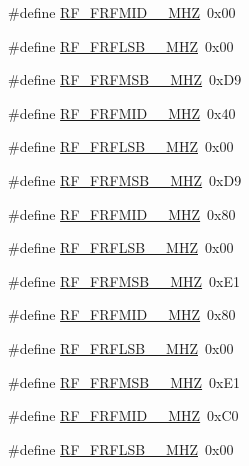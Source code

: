 \begin{DoxyCompactItemize}
\item 
\#define \mbox{\hyperlink{sx1276_regs-_fsk_8h_a2ba15a463e655bf6b331e41d1162abbc}{R\+F\+\_\+\+F\+R\+F\+M\+I\+D\+\_\+\_\+\+M\+HZ}}~0x00
\item 
\#define \mbox{\hyperlink{sx1276_regs-_fsk_8h_a9a969086561d3e987798039b3b9cac58}{R\+F\+\_\+\+F\+R\+F\+L\+S\+B\+\_\+\_\+\+M\+HZ}}~0x00
\item 
\#define \mbox{\hyperlink{sx1276_regs-_fsk_8h_ab854d00a5751351eb073ba41bd066d27}{R\+F\+\_\+\+F\+R\+F\+M\+S\+B\+\_\+\_\+\+M\+HZ}}~0x\+D9
\item 
\#define \mbox{\hyperlink{sx1276_regs-_fsk_8h_a337c9786171b07f0fa5f58d53ae10758}{R\+F\+\_\+\+F\+R\+F\+M\+I\+D\+\_\+\_\+\+M\+HZ}}~0x40
\item 
\#define \mbox{\hyperlink{sx1276_regs-_fsk_8h_a6925adb66395bd8bb21743caba42c9f9}{R\+F\+\_\+\+F\+R\+F\+L\+S\+B\+\_\+\_\+\+M\+HZ}}~0x00
\item 
\#define \mbox{\hyperlink{sx1276_regs-_fsk_8h_a2ace97f7a21f64054c6e3269922426a1}{R\+F\+\_\+\+F\+R\+F\+M\+S\+B\+\_\+\_\+\+M\+HZ}}~0x\+D9
\item 
\#define \mbox{\hyperlink{sx1276_regs-_fsk_8h_adbc52c9dc5896fe162b01114caba6fc5}{R\+F\+\_\+\+F\+R\+F\+M\+I\+D\+\_\+\_\+\+M\+HZ}}~0x80
\item 
\#define \mbox{\hyperlink{sx1276_regs-_fsk_8h_a6c0278026a620c9acd18814372785f46}{R\+F\+\_\+\+F\+R\+F\+L\+S\+B\+\_\+\_\+\+M\+HZ}}~0x00
\item 
\#define \mbox{\hyperlink{sx1276_regs-_fsk_8h_aede2d8353a6f4503837b467d42177217}{R\+F\+\_\+\+F\+R\+F\+M\+S\+B\+\_\+\_\+\+M\+HZ}}~0x\+E1
\item 
\#define \mbox{\hyperlink{sx1276_regs-_fsk_8h_a7f8d47495d559a0d89bee64f0f219578}{R\+F\+\_\+\+F\+R\+F\+M\+I\+D\+\_\+\_\+\+M\+HZ}}~0x80
\item 
\#define \mbox{\hyperlink{sx1276_regs-_fsk_8h_ac420052c647dbb18db24e44bd556dc45}{R\+F\+\_\+\+F\+R\+F\+L\+S\+B\+\_\+\_\+\+M\+HZ}}~0x00
\item 
\#define \mbox{\hyperlink{sx1276_regs-_fsk_8h_a20b708b5fdc452b10f5c014592235ed4}{R\+F\+\_\+\+F\+R\+F\+M\+S\+B\+\_\+\_\+\+M\+HZ}}~0x\+E1
\item 
\#define \mbox{\hyperlink{sx1276_regs-_fsk_8h_ad673e935e767a6107b7ed126f2b0e020}{R\+F\+\_\+\+F\+R\+F\+M\+I\+D\+\_\+\_\+\+M\+HZ}}~0x\+C0
\item 
\#define \mbox{\hyperlink{sx1276_regs-_fsk_8h_a9b654fee5670a21e74b9b3f2a71d1929}{R\+F\+\_\+\+F\+R\+F\+L\+S\+B\+\_\+\_\+\+M\+HZ}}~0x00

\end{DoxyCompactItemize}
